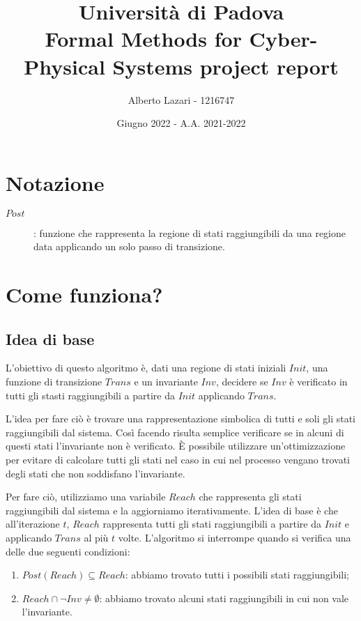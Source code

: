 \documentclass[12pt]{article}
\title{\textbf{Università di Padova \\ Formal Methods for Cyber-Physical Systems project report}}
\author{Alberto Lazari - 1216747\\}
\date{Giugno 2022 - A.A. 2021-2022}
\begin{document}
    \maketitle
    \pagebreak

    \tableofcontents
    \pagebreak

    \section{Notazione}
    \begin{description}
        \item[$Post$]: funzione che rappresenta la regione di stati raggiungibili da una regione data applicando un solo passo di transizione.
    \end{description}

    \section{Come funziona?}
    \subsection{Idea di base}
    L'obiettivo di questo algoritmo è, dati una regione di stati iniziali $Init$, una funzione di transizione $Trans$ e un invariante $Inv$, decidere se $Inv$ è verificato in tutti gli stasti raggiungibili a partire da $Init$ applicando $Trans$.

    L'idea per fare ciò è trovare una rappresentazione simbolica di tutti e soli gli stati raggiungibili dal sistema.
    Così facendo risulta semplice verificare se in alcuni di questi stati l'invariante non è verificato.
    È possibile utilizzare un'ottimizzazione per evitare di calcolare tutti gli stati nel caso in cui nel processo vengano trovati degli stati che non soddisfano l'invariante.

    Per fare ciò, utilizziamo una variabile $Reach$ che rappresenta gli stati raggiungibili dal sistema e la aggiorniamo iterativamente.
    L'idea di base è che all'iterazione $t$, $Reach$ rappresenta tutti gli stati raggiungibili a partire da $Init$ e applicando $Trans$ al più $t$ volte.
    L'algoritmo si interrompe quando si verifica una delle due seguenti condizioni:
    \begin{enumerate}
        \item $Post(Reach) \subseteq Reach $: abbiamo trovato tutti i possibili stati raggiungibili;
        \item $Reach \cap \neg Inv \neq \emptyset$: abbiamo trovato alcuni stati raggiungibili in cui non vale l'invariante.
    \end{enumerate}
\end{document}
